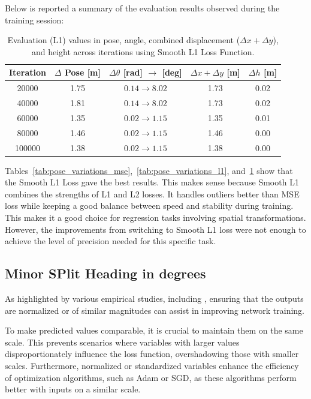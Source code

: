 Below is reported a summary of the evaluation results observed during the training session:
\begin{table}[H]
    \centering
    \renewcommand{\arraystretch}{1.2} 
    \setlength{\tabcolsep}{10pt} 
    \begin{tabular}{c c c c c}
        \toprule
        \textbf{Iteration} & \textbf{$\Delta$ Pose [m]} & \textbf{$\Delta \theta$ [rad] $\rightarrow$ [deg]} & \textbf{$\Delta x + \Delta y$ [m]} & \textbf{$\Delta h$ [m]} \\
        \midrule
        \num{20000}  & 1.75 & $0.14 \rightarrow 8.02$  & 1.73 & 0.02 \\
        \num{40000}  & 1.81 & $0.14 \rightarrow 8.02$  & 1.73 & 0.02 \\
        \num{60000}  & 1.35 & $0.02 \rightarrow 1.15$  & 1.35 & 0.01 \\
        \num{80000}  & 1.46 & $0.02 \rightarrow 1.15$  & 1.46 & 0.00 \\
        \num{100000} & 1.38 & $0.02 \rightarrow 1.15$  & 1.38 & 0.00 \\
        \bottomrule
    \end{tabular}
    \caption{Evaluation (L1) values in pose, angle, combined displacement ($\Delta x + \Delta y$), and height across iterations using Smooth L1 Loss Function.}
    \label{tab:pose_variations_l1s}
\end{table}

Tables~\ref{tab:pose_variations_mse},~\ref{tab:pose_variations_l1}, and~\ref{tab:pose_variations_l1s} show that the Smooth L1 Loss gave the best results. This makes sense because Smooth L1 combines the strengths of L1 and L2 losses. It handles outliers better than MSE loss while keeping a good balance between speed and stability during training. This makes it a good choice for regression tasks involving spatial transformations. However, the improvements from switching to Smooth L1 loss were not enough to achieve the level of precision needed for this specific task.

\subsection*{Minor SPlit Heading in degrees}
As highlighted by various empirical studies, including \cite{yu2022normalizationeffectsdeepneural}, ensuring that the outputs are normalized or of similar magnitudes can assist in improving network training.

To make predicted values comparable, it is crucial to maintain them on the same scale. This prevents scenarios where variables with larger values disproportionately influence the loss function, overshadowing those with smaller scales. Furthermore, normalized or standardized variables enhance the efficiency of optimization algorithms, such as Adam or SGD, as these algorithms perform better with inputs on a similar scale.

